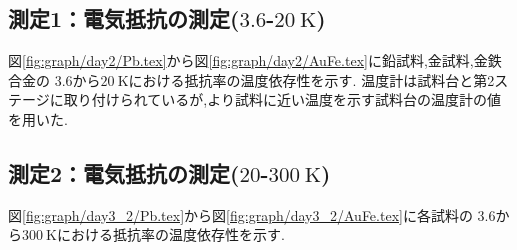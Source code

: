 \subsection{測定1：電気抵抗の測定($3.6$-$20\ \si{\kelvin}$)}
図\ref{fig:graph/day2/Pb.tex}から図\ref{fig:graph/day2/AuFe.tex}に鉛試料,金試料,金鉄合金の
$3.6$から$20\ \si{\kelvin}$における抵抗率の温度依存性を示す.
温度計は試料台と第2ステージに取り付けられているが,より試料に近い温度を示す試料台の温度計の値を用いた.
\clearpage
\subsection{測定2：電気抵抗の測定($20$-$300\ \si{\kelvin}$)}
図\ref{fig:graph/day3_2/Pb.tex}から図\ref{fig:graph/day3_2/AuFe.tex}に各試料の
$3.6$から$300\ \si{\kelvin}$における抵抗率の温度依存性を示す.
